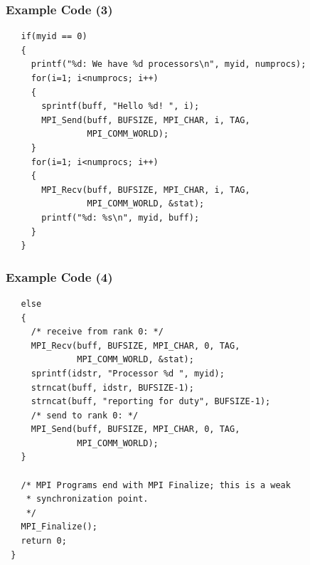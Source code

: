 \begin{frame}[fragile]
  \frametitle{Example Code (3)}
  

  \begin{lstlisting}
   if(myid == 0)
   {
     printf("%d: We have %d processors\n", myid, numprocs);
     for(i=1; i<numprocs; i++)
     {
       sprintf(buff, "Hello %d! ", i);
       MPI_Send(buff, BUFSIZE, MPI_CHAR, i, TAG,
                MPI_COMM_WORLD);
     }
     for(i=1; i<numprocs; i++)
     {
       MPI_Recv(buff, BUFSIZE, MPI_CHAR, i, TAG,
                MPI_COMM_WORLD, &stat);
       printf("%d: %s\n", myid, buff);
     }
   }
  \end{lstlisting}
  
\end{frame}

\begin{frame}[fragile]
  \frametitle{Example Code (4)}
  

  \begin{lstlisting}
   else
   {
     /* receive from rank 0: */
     MPI_Recv(buff, BUFSIZE, MPI_CHAR, 0, TAG,
              MPI_COMM_WORLD, &stat);
     sprintf(idstr, "Processor %d ", myid);
     strncat(buff, idstr, BUFSIZE-1);
     strncat(buff, "reporting for duty", BUFSIZE-1);
     /* send to rank 0: */
     MPI_Send(buff, BUFSIZE, MPI_CHAR, 0, TAG,
              MPI_COMM_WORLD);
   }
 
   /* MPI Programs end with MPI Finalize; this is a weak
    * synchronization point.
    */
   MPI_Finalize();
   return 0;
 }
  \end{lstlisting}
  
\end{frame}


